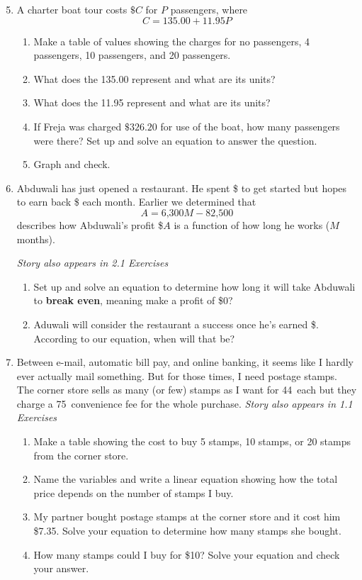 \begin{enumerate} 	
\setcounter{enumi}{4}

\item A charter boat tour costs $\$C$ for $P$ passengers, where
$$C = 135.00 + 11.95P$$ %
\begin{enumerate}
\item Make a table of values showing the charges for no passengers, 4 passengers, 10 passengers, and 20 passengers. 
\item What does the 135.00 represent and what are its units?
\item What does the 11.95 represent and what are its units? 
\item If Freja was charged $\$ 326.20$ for use of the boat, how many passengers were there? Set up and solve an equation to answer the question.  
\item Graph and check.
\end{enumerate}

\item Abduwali has just opened a restaurant. He spent \$ to get started but hopes to earn back \$ each month.  Earlier we determined that $$A = \text{6,300}M - \text{82,500}$$ describes how Abduwali's profit \$$A$ is a function of how long he works ($M$ months). 

\hfill \emph{Story also appears in 2.1 Exercises}
\begin{enumerate}
\item Set up and solve an equation to determine how long it will take Abduwali to \textbf{break even}, meaning make a profit of \$0?
\item Aduwali will consider the restaurant a success once he's earned \$.  According to our equation, when will that be?
\end{enumerate} 

\item Between e-mail, automatic bill pay, and online banking, it seems like I hardly ever actually mail something.   But for those times, I need postage stamps. The corner store sells as many (or few) stamps as I want for 44\textcent~each but they charge a 75\textcent~convenience fee for the whole purchase.  \hfill \emph{Story also appears in 1.1 Exercises}
\begin{enumerate}
\item Make a table showing the cost to buy 5 stamps, 10 stamps, or 20 stamps from the corner store.
\item Name the variables and write a linear equation showing how the total price depends on the number of stamps I buy.
\item My partner bought postage stamps at the corner store and it cost him \$7.35.  Solve your equation to determine how many stamps she bought. 
\item How many stamps could I buy for \$10?  Solve your equation and check your answer.
\end{enumerate} 


\end{enumerate}
